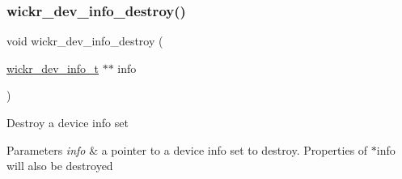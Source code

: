 \subsubsection{\texorpdfstring{wickr\+\_\+dev\+\_\+info\+\_\+destroy()}{wickr\_dev\_info\_destroy()}}
{\footnotesize\ttfamily void wickr\+\_\+dev\+\_\+info\+\_\+destroy (\begin{DoxyParamCaption}\item[{\mbox{\hyperlink{structwickr__dev__info}{wickr\+\_\+dev\+\_\+info\+\_\+t}} $\ast$$\ast$}]{info }\end{DoxyParamCaption})}

Destroy a device info set


\begin{DoxyParams}{Parameters}
{\em info} & a pointer to a device info set to destroy. Properties of \textquotesingle{}$\ast$info\textquotesingle{} will also be destroyed \\
\hline
\end{DoxyParams}
